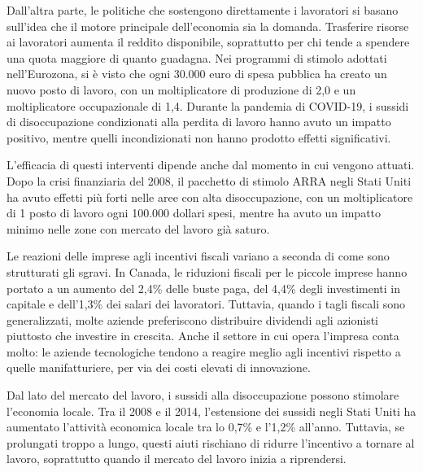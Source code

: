 \documentclass[12pt]{book} %
\begin{document}
Dall'altra parte, le politiche che sostengono direttamente i lavoratori si basano sull'idea che il motore principale dell'economia sia la domanda. Trasferire risorse ai lavoratori aumenta il reddito disponibile, soprattutto per chi tende a spendere una quota maggiore di quanto guadagna. Nei programmi di stimolo adottati nell'Eurozona, si è visto che ogni 30.000 euro di spesa pubblica ha creato un nuovo posto di lavoro, con un moltiplicatore di produzione di 2,0 e un moltiplicatore occupazionale di 1,4. Durante la pandemia di COVID-19, i sussidi di disoccupazione condizionati alla perdita di lavoro hanno avuto un impatto positivo, mentre quelli incondizionati non hanno prodotto effetti significativi.

L'efficacia di questi interventi dipende anche dal momento in cui vengono attuati. Dopo la crisi finanziaria del 2008, il pacchetto di stimolo ARRA negli Stati Uniti ha avuto effetti più forti nelle aree con alta disoccupazione, con un moltiplicatore di 1 posto di lavoro ogni 100.000 dollari spesi, mentre ha avuto un impatto minimo nelle zone con mercato del lavoro già saturo.

Le reazioni delle imprese agli incentivi fiscali variano a seconda di come sono strutturati gli sgravi. In Canada, le riduzioni fiscali per le piccole imprese hanno portato a un aumento del 2,4\% delle buste paga, del 4,4\% degli investimenti in capitale e dell'1,3\% dei salari dei lavoratori. Tuttavia, quando i tagli fiscali sono generalizzati, molte aziende preferiscono distribuire dividendi agli azionisti piuttosto che investire in crescita. Anche il settore in cui opera l'impresa conta molto: le aziende tecnologiche tendono a reagire meglio agli incentivi rispetto a quelle manifatturiere, per via dei costi elevati di innovazione.

Dal lato del mercato del lavoro, i sussidi alla disoccupazione possono stimolare l'economia locale. Tra il 2008 e il 2014, l'estensione dei sussidi negli Stati Uniti ha aumentato l'attività economica locale tra lo 0,7\% e l'1,2\% all'anno. Tuttavia, se prolungati troppo a lungo, questi aiuti rischiano di ridurre l'incentivo a tornare al lavoro, soprattutto quando il mercato del lavoro inizia a riprendersi.
\end{document}
